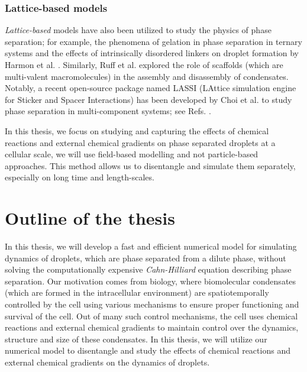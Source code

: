 \subsubsection{Lattice-based models}

\textit{Lattice-based} models have also been utilized to study the physics of phase separation; for example, the phenomena of gelation in phase separation in ternary systems and the effects of intrinsically disordered linkers on droplet formation by Harmon et al. \cite{Harmon_2018, Harmon1}.
Similarly, Ruff et al. \cite{Ruff2021} explored the role of scaffolds (which are multi-valent macromolecules) in the assembly and disassembly of condensates. 
Notably, a recent open-source package named LASSI (LAttice simulation engine for Sticker and Spacer Interactions) has been developed by Choi et al. \cite{LASSI} to study phase separation in multi-component systems; see Refs. \cite{Dar2020,Ranganathan2020}.

In this thesis, we focus on studying and capturing the effects of chemical reactions and external chemical gradients on phase separated droplets at a cellular scale, we will use field-based modelling and not particle-based approaches. 
This method allows us to disentangle and simulate them separately, especially on long time and length-scales.

\section{Outline of the thesis}

In this thesis, we will develop a fast and efficient numerical model for simulating dynamics of droplets, which are phase separated from a dilute phase, without solving the computationally expensive \textit{Cahn-Hilliard} equation describing phase separation.
Our motivation comes from biology, where biomolecular condensates (which are formed in the intracellular environment) are spatiotemporally controlled by the cell using various mechanisms to ensure proper functioning and survival of the cell.
Out of many such control mechanisms, the cell uses chemical reactions and external chemical gradients to maintain control over the dynamics, structure and size of these condensates.
In this thesis, we will utilize our numerical model to disentangle and study the effects of chemical reactions and external chemical gradients on the dynamics of droplets. 

